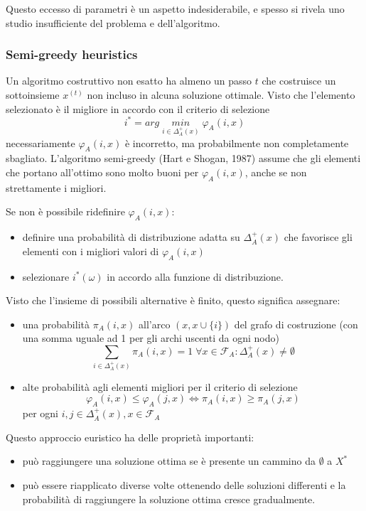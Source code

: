 \documentclass{article}
\begin{document}
Questo eccesso di parametri è un aspetto indesiderabile, e spesso si rivela uno studio insufficiente del
problema e dell'algoritmo.

\subsubsection{Semi-greedy heuristics}
Un algoritmo costruttivo non esatto ha almeno un passo $t$ che costruisce un sottoinsieme
$x^{(t)}$ non incluso in alcuna soluzione ottimale. Visto che l'elemento selezionato è il migliore
in accordo con il criterio di selezione
$$i^*=arg\;\underset{i\in\Delta_A^+(x)}{min}\;\varphi_A(i,x)$$
necessariamente $\varphi_A(i,x)$ è incorretto, ma probabilmente non completamente sbagliato.
L'algoritmo semi-greedy (Hart e Shogan, 1987) assume che gli elementi che portano all'ottimo sono molto
buoni per $\varphi_A(i,x)$, anche se non strettamente i migliori.

Se non è possibile ridefinire $\varphi_A(i,x)$:
\begin{itemize}
    \item definire una probabilità di distribuzione adatta su $\Delta_A^+(x)$ che favorisce
          gli elementi con i migliori valori di $\varphi_A(i,x)$
    \item selezionare $i^*(\omega)$ in accordo alla funzione di distribuzione.
\end{itemize}
Visto che l'insieme di possibili alternative è finito, questo significa assegnare:
\begin{itemize}
    \item una probabilità $\pi_A(i,x)$ all'arco $(x,x\cup\{i\})$ del grafo di costruzione (con una
          somma uguale ad 1 per gli archi uscenti da ogni nodo)
          $$\sum_{i\in\Delta_A^+(x)}\pi_A(i,x)=1\;\forall x\in\mathcal{F}_A:\Delta_A^+(x)\neq\emptyset$$
    \item alte probabilità agli elementi migliori per il criterio di selezione
          $$\varphi_A(i,x)\leq\varphi_A(j,x)\Leftrightarrow\pi_A(i,x)\geq\pi_A(j,x)$$
          per ogni $i,j\in\Delta_A^+(x),x\in\mathcal{F}_A$
\end{itemize}

Questo approccio euristico ha delle proprietà importanti:
\begin{itemize}
    \item può raggiungere una soluzione ottima se è presente un cammino da $\emptyset$ a $X^*$
    \item può essere riapplicato diverse volte ottenendo delle soluzioni differenti e la probabilità
          di raggiungere la soluzione ottima cresce gradualmente.

\end{itemize}
\end{document}
